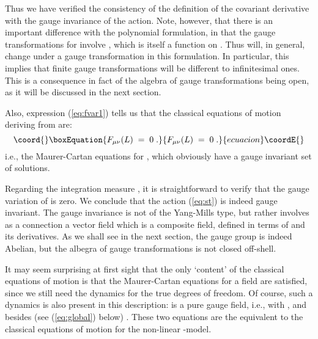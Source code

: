 \documentclass[a4paper,12pt]{article}
\begin{document}
Thus we have verified the consistency of the definition of the
covariant derivative with the gauge invariance of the action. Note,
however, that there is an important difference with the polynomial
formulation, in that the gauge transformations for \myHighlight{$\theta$}\coordHE{} involve
\coordHE{}, which is itself a function on \myHighlight{$\theta$}\coordHE{}.  Thus \coordHE{} will, in
general, change under a gauge transformation in this formulation. In
particular, this implies that finite gauge transformations will be
different to infinitesimal ones. This is a consequence in fact of the
algebra of gauge transformations being open, as it will be discussed
in the next section.


Also, expression (\ref{eq:fvar1}) tells us that the classical
equations of motion deriving from \coordHE{} are:
\begin{equation}\coord{}\boxEquation{\label{eq:mc}
F_{\mu\nu}(L) \;=\; 0 \;.
}{F_{\mu\nu}(L) \;=\; 0 \;.
}{ecuacion}\coordE{}\end{equation}
i.e., the Maurer-Cartan equations for \coordHE{}, which obviously have a
gauge invariant set of solutions.  

Regarding the integration measure \coordHE{}, it is
straightforward to verify that the gauge variation of \coordHE{} is zero.  We conclude that the action (\ref{eq:st}) is
indeed gauge invariant.  The gauge invariance is not of the Yang-Mills
type, but rather involves as a connection a vector field \coordHE{} which
is a composite field, defined in terms of \myHighlight{$\theta_\mu$}\coordHE{} and its
derivatives.  As we shall see in the next section, the gauge group is
indeed Abelian, but the albegra of gauge transformations is not closed
off-shell.
 
It may seem surprising at first sight that the only `content' of the
classical equations of motion is that the Maurer-Cartan equations for
a field are satisfied, since we still need the dynamics for the true
degrees of freedom. Of course, such a dynamics is also present in this
description: \coordHE{} is a pure gauge field, i.e., \coordHE{} with \coordHE{}, and besides (see
(\ref{eq:global}) below) \coordHE{}. These two
equations are the equivalent to the classical equations of motion for
the non-linear \myHighlight{$\sigma$}\coordHE{}-model.
\end{document}
